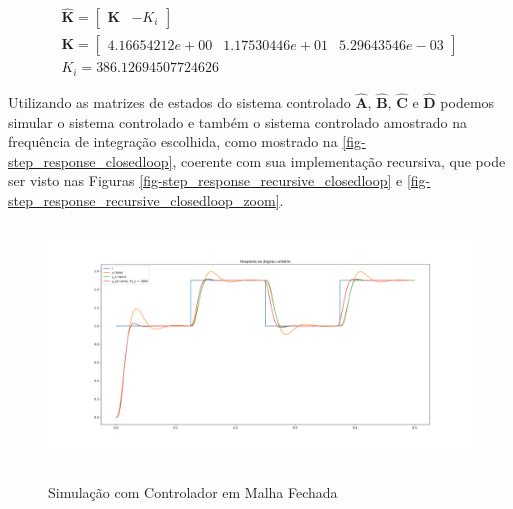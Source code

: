 \documentclass[
	12pt,				%
	article,			%
	openright,			%
	oneside,
	a4paper,			%
	chapter=TITLE,		%
	section=TITLE,		%
	english,			%
	french,				%
	spanish,			%
	brazil,				%
]{abntex2}
\begin{document}
\begin{eqnarray}
                    \nonumber
                    \boldsymbol{\hat{K}} = \begin{bmatrix}
                        \boldsymbol{K} & -K_i
                    \end{bmatrix} \\
                    \label{eq-K}
                    \boldsymbol{K} = \begin{bmatrix}
                        4.16654212e+00 & 1.17530446e+01 & 5.29643546e-03
                    \end{bmatrix} \\
                    K_i = 386.12694507724626
                \end{eqnarray}
                
                Utilizando as matrizes de estados do sistema controlado $\boldsymbol{\hat{A}}$, $\boldsymbol{\hat{B}}$, $\boldsymbol{\hat{C}}$ e $\boldsymbol{\hat{D}}$ podemos simular o sistema controlado e também o sistema controlado amostrado na frequência de integração escolhida, como mostrado na \autoref{fig-step_response_closedloop}, coerente com sua implementação recursiva, que pode ser visto nas Figuras \ref{fig-step_response_recursive_closedloop} e \ref{fig-step_response_recursive_closedloop_zoom}.
                
                \begin{figure}[htbp]
                	\centering
                	\caption{Simulação com Controlador em Malha Fechada}
                	\includegraphics[width=\textwidth,height=240px,keepaspectratio]{imgs/step_response_closedloop.png}
                	\label{fig-step_response_closedloop}
            	\end{figure}
            	
\end{document}
